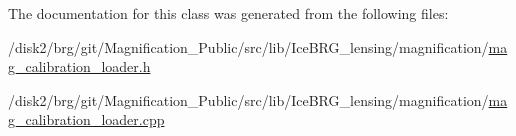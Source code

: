 The documentation for this class was generated from the following files\+:\begin{DoxyCompactItemize}
\item 
/disk2/brg/git/\+Magnification\+\_\+\+Public/src/lib/\+Ice\+B\+R\+G\+\_\+lensing/magnification/\hyperlink{mag__calibration__loader_8h}{mag\+\_\+calibration\+\_\+loader.\+h}\item 
/disk2/brg/git/\+Magnification\+\_\+\+Public/src/lib/\+Ice\+B\+R\+G\+\_\+lensing/magnification/\hyperlink{mag__calibration__loader_8cpp}{mag\+\_\+calibration\+\_\+loader.\+cpp}\end{DoxyCompactItemize}
